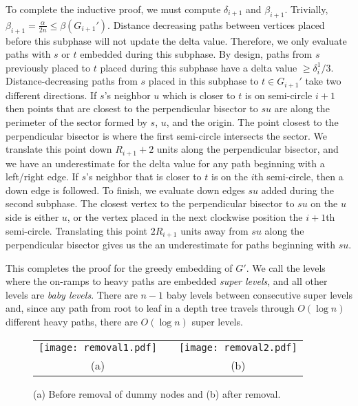 \documentclass[11pt]{article}
\begin{document}
To complete the inductive proof, we must compute $\delta_{i+1}$ and $\beta_{i+1}$. 
Trivially, $\beta_{i+1} = \frac{\alpha}{2n} \leq \beta(G_{i+1}')$.
Distance decreasing paths between vertices placed before this subphase
will not update the delta value. Therefore, we only evaluate paths 
with $s$ or $t$ embedded during this subphase.
By design, paths from $s$ previously placed to $t$ placed during 
this subphase have a delta value $\geq \delta_{i}^1/3$. Distance-decreasing paths 
from $s$ placed in this subphase to $t\in G_{i+1}'$ take two 
different directions. If $s$'s neighbor $u$ which is closer to $t$
is on semi-circle $i+1$ then points that are closest to the 
perpendicular bisector to $su$ are along the perimeter of the sector formed
by $s$, $u$, and the origin. The point closest to the perpendicular bisector 
is where the first semi-circle intersects the sector. We translate this 
point down $R_{i+1} + 2$ units along the perpendicular
bisector, and we have an underestimate for the delta value for
any path beginning with a left/right edge. If $s$'s 
neighbor that is closer to $t$ is on the $i$th semi-circle, then
a down edge is followed. To finish, we evaluate down edges $su$
added during the second subphase. The closest vertex to the 
perpendicular bisector to $su$ on the $u$ side is either $u$, or the
vertex placed in the next clockwise position the $i+1$th semi-circle. 
Translating this point $2R_{i+1}$ units away from $su$ along 
the perpendicular bisector gives us the an underestimate for
paths beginning with $su$. 

This completes the proof for the greedy embedding of $G'$. 
 We call the levels where the on-ramps to heavy paths are embedded 
 \emph{super levels}, 
and all other levels are \emph{baby levels}. There are $n-1$ 
baby levels between consecutive super levels and, since any path from root to leaf
in a depth tree travels through $O(\log n)$ different heavy paths, there are $O(\log{n})$ super 
levels. 
\ifFull \begin{figure}[!t]
\begin{center}
\begin{tabular}{ccc}
\texttt{[image: removal1.pdf]}
&
\hspace{10pt}
&
\texttt{[image: removal2.pdf]} \\
(a) && (b)
\end{tabular}
\caption{(a) Before removal of dummy nodes and (b) after removal.}
\label{fig:removal}
\end{center}
\end{figure}
\end{document}
